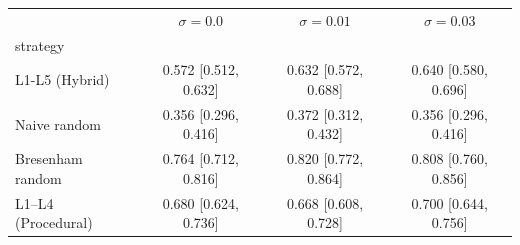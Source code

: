 \begin{tabular}{lccc}
\toprule
 & $\sigma=0.0$ & $\sigma=0.01$ & $\sigma=0.03$ \\
strategy &  &  &  \\
\midrule
L1-L5 (Hybrid) & 0.572 [0.512, 0.632] & 0.632 [0.572, 0.688] & 0.640 [0.580, 0.696] \\
Naive random & 0.356 [0.296, 0.416] & 0.372 [0.312, 0.432] & 0.356 [0.296, 0.416] \\
Bresenham random & 0.764 [0.712, 0.816] & 0.820 [0.772, 0.864] & 0.808 [0.760, 0.856] \\
L1–L4 (Procedural) & 0.680 [0.624, 0.736] & 0.668 [0.608, 0.728] & 0.700 [0.644, 0.756] \\
\bottomrule
\end{tabular}
